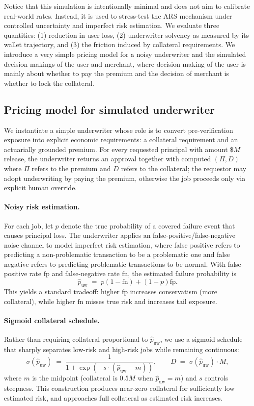 \documentclass{article} %
\begin{document}
Notice that this simulation is intentionally minimal and does not aim to calibrate real-world rates. Instead, it is used to stress-test the \textsc{ARS} mechanism under controlled uncertainty and imperfect risk estimation. We evaluate three quantities: (1) reduction in user loss, (2) underwriter solvency as measured by its wallet trajectory, and (3) the friction induced by collateral requirements. We introduce a very simple pricing model for a noisy underwriter and the simulated decision makings of the user and merchant, where decision making of the user is mainly about whether to pay the premium and the decision of merchant is whether to lock the collateral.

\subsection{Pricing model for simulated underwriter}
We instantiate a simple underwriter whose role is to convert pre-verification exposure into explicit economic requirements: a collateral requirement and an actuarially grounded premium. For every requested principal with amount $\$M$ release, the underwriter returns an approval together with computed $(\Pi,D)$ where $\Pi$ refers to the premium and $D$ refers to the collateral; the requestor may adopt underwriting by paying the premium, otherwise the job proceeds only via explicit human override.

\paragraph{Noisy risk estimation.}
For each job, let $p$ denote the true probability of a covered failure event that causes principal loss. The underwriter applies an false-positive/false-negative noise channel to model imperfect risk estimation, where false positive refers to predicting a non-problematic transaction to be a problematic one and false negative refers to predicting problematic transactions to be normal. With false-positive rate $\mathrm{fp}$ and false-negative rate $\mathrm{fn}$, the estimated failure probability is
\[
\hat p_{\mathrm{uw}} \;=\; p(1-\mathrm{fn}) + (1-p)\mathrm{fp}.
\]
This yields a standard tradeoff: higher $\mathrm{fp}$ increases conservatism (more collateral), while higher $\mathrm{fn}$ misses true risk and increases tail exposure.

\paragraph{Sigmoid collateral schedule.}
Rather than requiring collateral proportional to $\hat p_{\mathrm{uw}}$, we use a sigmoid schedule that sharply separates low-risk and high-risk jobs while remaining continuous:
\[
\sigma(\hat p_{\mathrm{uw}})\;=\;\frac{1}{1+\exp\!\left(-s\cdot(\hat p_{\mathrm{uw}}-m)\right)},\qquad
D \;=\; \sigma(\hat p_{\mathrm{uw}})\cdot M,
\]
where $m$ is the midpoint (collateral is $0.5M$ when $\hat p_{\mathrm{uw}}=m$) and $s$ controls steepness. This construction produces near-zero collateral for sufficiently low estimated risk, and approaches full collateral as estimated risk increases.
\end{document}

